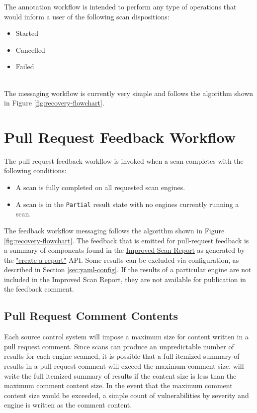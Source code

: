 The annotation workflow is intended to perform any type of operations that
would inform a user of the following scan dispositions:

\begin{itemize}
    \item Started
    \item Cancelled
    \item Failed
\end{itemize}

\noindent\\The messaging workflow is currently very simple and follows the algorithm
shown in Figure \ref{fig:recovery-flowchart}.

\section{Pull Request Feedback Workflow}\label{sec:pull-request-workflow}

The pull request feedback workflow is invoked when a scan completes with the
following conditions:

\begin{itemize}
    \item A scan is fully completed on all requested scan engines.
    \item A scan is in the \texttt{Partial} result state with no
    engines currently running a scan.
\end{itemize}

The feedback workflow messaging follows the algorithm shown in
Figure \ref{fig:recovery-flowchart}.  The feedback that is emitted
for pull-request feedback is a summary of components found in the
\href{https://docs.checkmarx.com/en/34965-182434-checkmarx-one-reporting.html}{Improved Scan Report}
as generated by the
\href{https://checkmarx.stoplight.io/docs/checkmarx-one-api-reference-guide/branches/main/7bf86350cfe72-create-a-report}{"create a report"}
\cxone API.  Some results can be excluded via configuration,
as described in Section \ref{sec:yaml-config}.  If the results of a particular
engine are not included in the Improved Scan Report, they are not available for
publication in the feedback comment.

\subsection{Pull Request Comment Contents}

Each source control system will impose a maximum size for content written in
a pull request comment.  Since scans can produce an unpredictable number of
results for each engine scanned, it is possible that a full itemized
summary of results in a pull request comment will exceed the maximum comment
size.  \cxoneflow will write the full itemized summary of results if the
content size is less than the maximum comment content size.  In the event that
the maximum comment content size would be exceeded, a simple count of
vulnerabilities by severity and engine is written as the comment content.


